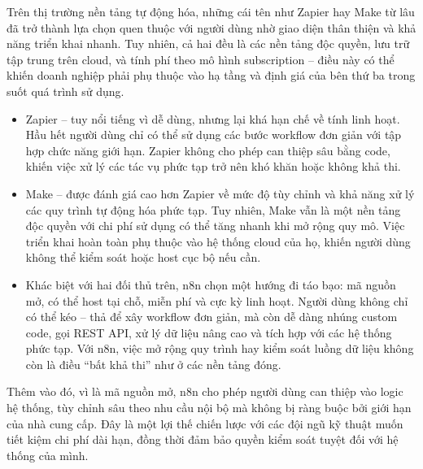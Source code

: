 
Trên thị trường nền tảng tự động hóa, những cái tên như Zapier hay Make từ lâu đã trở thành lựa chọn quen thuộc với người dùng nhờ giao diện thân thiện và khả năng triển khai nhanh. Tuy nhiên, cả hai đều là các nền tảng độc quyền, lưu trữ tập trung trên cloud, và tính phí theo mô hình subscription – điều này có thể khiến doanh nghiệp phải phụ thuộc vào hạ tầng và định giá của bên thứ ba trong suốt quá trình sử dụng.

\begin{itemize}
    \item Zapier – tuy nổi tiếng vì dễ dùng, nhưng lại khá hạn chế về tính linh hoạt. Hầu hết người dùng chỉ có thể sử dụng các bước workflow đơn giản với tập hợp chức năng giới hạn. Zapier không cho phép can thiệp sâu bằng code, khiến việc xử lý các tác vụ phức tạp trở nên khó khăn hoặc không khả thi.

    \item Make – được đánh giá cao hơn Zapier về mức độ tùy chỉnh và khả năng xử lý các quy trình tự động hóa phức tạp. Tuy nhiên, Make vẫn là một nền tảng độc quyền với chi phí sử dụng có thể tăng nhanh khi mở rộng quy mô. Việc triển khai hoàn toàn phụ thuộc vào hệ thống cloud của họ, khiến người dùng không thể kiểm soát hoặc host cục bộ nếu cần.
    \item Khác biệt với hai đối thủ trên, n8n chọn một hướng đi táo bạo: mã nguồn mở, có thể host tại chỗ, miễn phí và cực kỳ linh hoạt. Người dùng không chỉ có thể kéo – thả để xây workflow đơn giản, mà còn dễ dàng nhúng custom code, gọi REST API, xử lý dữ liệu nâng cao và tích hợp với các hệ thống phức tạp. Với n8n, việc mở rộng quy trình hay kiểm soát luồng dữ liệu không còn là điều “bất khả thi” như ở các nền tảng đóng.

\end{itemize}
Thêm vào đó, vì là mã nguồn mở, n8n cho phép người dùng can thiệp vào logic hệ thống, tùy chỉnh sâu theo nhu cầu nội bộ mà không bị ràng buộc bởi giới hạn của nhà cung cấp. Đây là một lợi thế chiến lược với các đội ngũ kỹ thuật muốn tiết kiệm chi phí dài hạn, đồng thời đảm bảo quyền kiểm soát tuyệt đối với hệ thống của mình.




